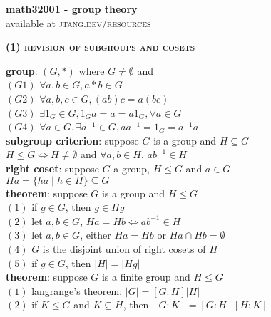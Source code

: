 \documentclass[a4paper]{article}
\newcommand\abs[1]{\ensuremath{\lvert#1\rvert}}
\begin{document}
	
\begin{center}
	\huge{\textbf{math32001 - group theory}}\\
	\small{available at \textsc{jtang.dev/resources}}\\
\end{center}

\begin{multicols}{2}

\begin{framed}
	\begin{center}
		\textbf{\textsc{(1) revision of subgroups and cosets}}
	\end{center}
	
	\noindent
	\textbf{group}: $(G, *)$ where $G \neq \emptyset$ and\\
	$(G1)$ $\forall a, b \in G, a * b \in G$\\
	$(G2)$ $\forall a, b, c \in G, (ab)c = a(bc)$\\
	$(G3)$ $\exists 1_G \in G, 1_Ga = a = a1_G, \forall a \in G$\\
	$(G4)$ $\forall a \in G, \exists a^{-1} \in G, aa^{-1} = 1_G = a^{-1}a$\\
	
	\noindent
	\textbf{subgroup criterion}: suppose $G$ is a group and $H \subseteq G$\\
	$H \leq G \iff H \neq \emptyset$ and $\forall a, b \in H$, $ab^{-1} \in H$\\
	
	\noindent
	\textbf{right coset}: suppose $G$ a group, $H \leq G$ and $a \in G$\\
	$Ha = \{ha \; \vert \; h \in H\} \subseteq G$\\
	
	\noindent
	\textbf{theorem}: suppose $G$ is a group and $H \leq G$\\
	$(1)$ if $g \in G$, then $g \in Hg$\\
	$(2)$ let $a, b \in G$, $Ha = Hb \iff ab^{-1} \in H$\\
	$(3)$ let $a, b \in G$, either $Ha = Hb$ or $Ha \cap Hb = \emptyset$\\
	$(4)$ $G$ is the disjoint union of right cosets of $H$\\
	$(5)$ if $g \in G$, then $\abs{H} = \abs{Hg}$\\
	
	\noindent
	\textbf{theorem}: suppose $G$ is a finite group and $H \leq G$\\
	$(1)$ langrange's theorem: $\abs{G} = [G : H]\abs{H}$\\
	$(2)$ if $K \leq G$ and $K \subseteq H$, then $[G:K]=[G:H][H:K]$\\
	

\end{framed}
\end{multicols}
\end{document}
